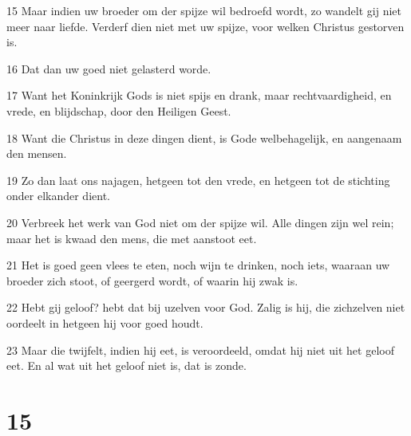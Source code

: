 \par 15 Maar indien uw broeder om der spijze wil bedroefd wordt, zo wandelt gij niet meer naar liefde. Verderf dien niet met uw spijze, voor welken Christus gestorven is.
\par 16 Dat dan uw goed niet gelasterd worde.
\par 17 Want het Koninkrijk Gods is niet spijs en drank, maar rechtvaardigheid, en vrede, en blijdschap, door den Heiligen Geest.
\par 18 Want die Christus in deze dingen dient, is Gode welbehagelijk, en aangenaam den mensen.
\par 19 Zo dan laat ons najagen, hetgeen tot den vrede, en hetgeen tot de stichting onder elkander dient.
\par 20 Verbreek het werk van God niet om der spijze wil. Alle dingen zijn wel rein; maar het is kwaad den mens, die met aanstoot eet.
\par 21 Het is goed geen vlees te eten, noch wijn te drinken, noch iets, waaraan uw broeder zich stoot, of geergerd wordt, of waarin hij zwak is.
\par 22 Hebt gij geloof? hebt dat bij uzelven voor God. Zalig is hij, die zichzelven niet oordeelt in hetgeen hij voor goed houdt.
\par 23 Maar die twijfelt, indien hij eet, is veroordeeld, omdat hij niet uit het geloof eet. En al wat uit het geloof niet is, dat is zonde.

\chapter{15}


